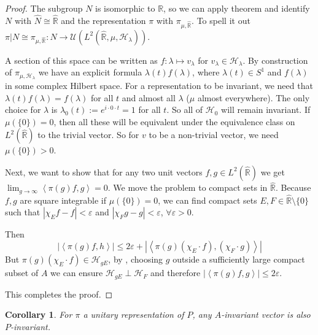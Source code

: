 \documentclass[
  12pt
]{article}
\newtheorem{cor}[thm]{Corollary}
\theoremstyle{plain}
\newtheorem*{proof}{Proof}
\newcommand{\mpi}{\ensuremath{\pi}\xspace}
\newcommand{\bbr}{\ensuremath{\mathbb{R}}\xspace}
\newcommand{\hilb}{\ensuremath{\mathscr{H}}\xspace}
\newcommand{\abs}[1]{| #1 |}
\newcommand{\inn}[1]{\left\langle #1 \right\rangle}
\begin{document}
  \begin{proof}
    The subgroup $N$ is isomorphic to \bbr, so we can apply theorem 
    and identify $N$ with $\hat{N} \cong \hat{\bbr}$ and the representation \mpi with $\pi_{\mu, \hat{\bbr}}$.
    To spell it out $\pi|N \cong \pi_{\mu, \hat{\bbr}}: N \rightarrow \mathcal{U}(L^2(\hat{\bbr}, \mu, \hilb_{\lambda}))$.

    A section of this space can be written as $f: \lambda \mapsto v_{\lambda}$ for $v_{\lambda} \in \hilb_{\lambda}$.
    By construction of $\pi_{\mu, \hilb_{\lambda}}$ we have an explicit
    formula $\lambda(t)f(\lambda)$, where $\lambda(t) \in S^1$ and $f(\lambda)$ in some complex Hilbert space.
    For a representation to be invariant, we need that $\lambda(t)f(\lambda) = f(\lambda)$ for all $t$ and almost all $\lambda$ ($\mu$ almost everywhere).
    The only choice for $\lambda$ is $\lambda_0(t) := e^{i \cdot 0 \cdot t} = 1$ for all $t$.
    So all of $\hilb_0$ will remain invariant.
    If $\mu(\{0\}) = 0$, then all these will be equivalent under the equivalence class on $L^2(\hat{\bbr})$ to the trivial vector.
    So for $v$ to be a non-trivial vector, we need $\mu(\{0\}) > 0$.

    Next, we want to show that for any two unit vectors $f, g \in L^2(\hat{\bbr})$ we get $\lim_{g\to\infty} \inn{\pi(g)f,g} = 0$.
    We move the problem to compact sets in $\hat{\bbr}$.
    Because $f,g$ are square integrable if $\mu(\{0\})=0$, we can find
    compact sets $E, F \in \hat{\bbr}\setminus \{0\}$ such that $\abs{\chi_Ef -
    f} < \varepsilon$ and $\abs{\chi_Fg -g} < \varepsilon$, $\forall
    \varepsilon > 0$.

    Then
    $$
    \abs{\inn{\pi(g)f, h}} \leq 2\varepsilon + \abs{\inn{\pi(g)(\chi_E\cdot f), (\chi_F \cdot g)}}
    $$
    But $\pi(g)(\chi_E\cdot f) \in \hilb_{gE}$, by , choosing $g$ outside a sufficiently large compact subset of $A$ we can ensure $\hilb_{gE}\perp \hilb_{F}$ and therefore $\abs{\inn{\pi(g)f, g}} \leq 2\varepsilon$.

    This completes the proof.

  \end{proof}

  \begin{cor}
    \label{cor:2.3.7}
    For \mpi a unitary representation of $P$, any $A$-invariant vector is also $P$-invariant.
  \end{cor}
\end{document}
